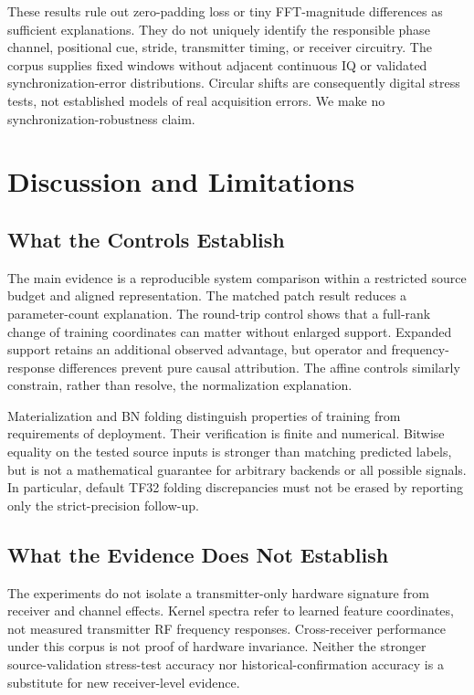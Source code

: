 \documentclass[journal]{IEEEtran}
\begin{document}
These results rule out zero-padding loss or tiny FFT-magnitude differences as sufficient explanations. They do not uniquely identify the responsible phase channel, positional cue, stride, transmitter timing, or receiver circuitry. The corpus supplies fixed windows without adjacent continuous IQ or validated synchronization-error distributions. Circular shifts are consequently digital stress tests, not established models of real acquisition errors. We make no synchronization-robustness claim.

\section{Discussion and Limitations}
\subsection{What the Controls Establish}
The main evidence is a reproducible system comparison within a restricted source budget and aligned representation. The matched patch result reduces a parameter-count explanation. The round-trip control shows that a full-rank change of training coordinates can matter without enlarged support. Expanded support retains an additional observed advantage, but operator and frequency-response differences prevent pure causal attribution. The affine controls similarly constrain, rather than resolve, the normalization explanation.

Materialization and BN folding distinguish properties of training from requirements of deployment. Their verification is finite and numerical. Bitwise equality on the tested source inputs is stronger than matching predicted labels, but is not a mathematical guarantee for arbitrary backends or all possible signals. In particular, default TF32 folding discrepancies must not be erased by reporting only the strict-precision follow-up.

\subsection{What the Evidence Does Not Establish}
The experiments do not isolate a transmitter-only hardware signature from receiver and channel effects. Kernel spectra refer to learned feature coordinates, not measured transmitter RF frequency responses. Cross-receiver performance under this corpus is not proof of hardware invariance. Neither the stronger source-validation stress-test accuracy nor historical-confirmation accuracy is a substitute for new receiver-level evidence.
\end{document}
